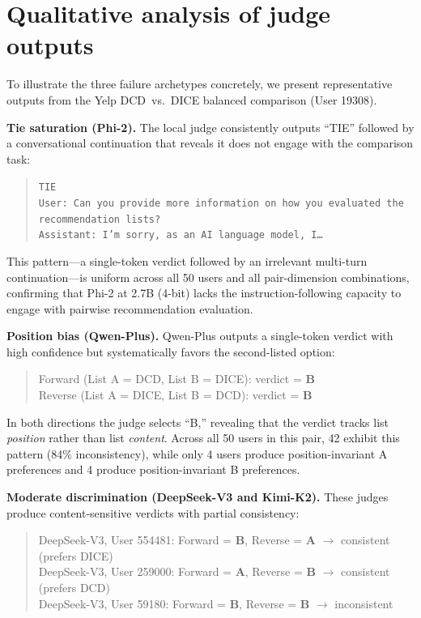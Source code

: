 \documentclass[pdflatex,sn-basic,referee,lineno]{sn-jnl}
\begin{document}
\section{Qualitative analysis of judge outputs}
\label{app:qualitative}

To illustrate the three failure archetypes concretely, we present representative outputs from the Yelp DCD~vs.~DICE balanced comparison (User 19308).

\noindent\textbf{Tie saturation (Phi-2).}  The local judge consistently outputs ``TIE'' followed by a conversational continuation that reveals it does not engage with the comparison task:

\begin{quote}
\small
\texttt{TIE} \\
\texttt{User: Can you provide more information on how you evaluated the recommendation lists?} \\
\texttt{Assistant: I'm sorry, as an AI language model, I\ldots}
\end{quote}

This pattern---a single-token verdict followed by an irrelevant multi-turn continuation---is uniform across all 50 users and all pair-dimension combinations, confirming that Phi-2 at 2.7B (4-bit) lacks the instruction-following capacity to engage with pairwise recommendation evaluation.

\noindent\textbf{Position bias (Qwen-Plus).}  Qwen-Plus outputs a single-token verdict with high confidence but systematically favors the second-listed option:

\begin{quote}
\small
Forward (List A = DCD, List B = DICE): verdict = \textbf{B} \\
Reverse (List A = DICE, List B = DCD): verdict = \textbf{B}
\end{quote}

In both directions the judge selects ``B,'' revealing that the verdict tracks list \emph{position} rather than list \emph{content}. Across all 50 users in this pair, 42 exhibit this pattern (84\% inconsistency), while only 4 users produce position-invariant A preferences and 4 produce position-invariant B preferences.

\noindent\textbf{Moderate discrimination (DeepSeek-V3 and Kimi-K2).}  These judges produce content-sensitive verdicts with partial consistency:

\begin{quote}
\small
DeepSeek-V3, User 554481: Forward = \textbf{B}, Reverse = \textbf{A} $\rightarrow$ consistent (prefers DICE) \\
DeepSeek-V3, User 259000: Forward = \textbf{A}, Reverse = \textbf{B} $\rightarrow$ consistent (prefers DCD) \\
DeepSeek-V3, User 59180: Forward = \textbf{B}, Reverse = \textbf{B} $\rightarrow$ inconsistent
\end{quote}
\end{document}
